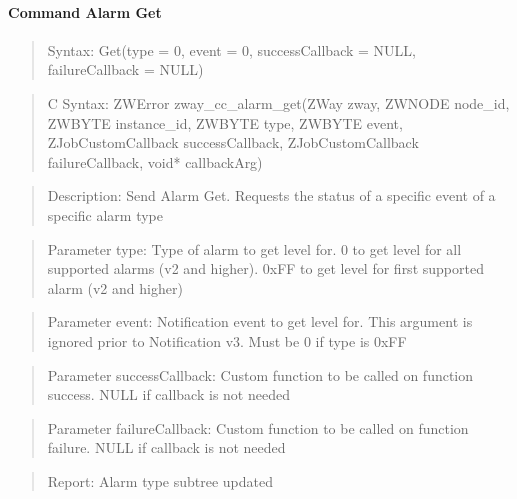 \paragraph{Command Alarm Get}
\begin{quote}Syntax: Get(type = 0, event = 0, successCallback = NULL, failureCallback = NULL)\end{quote}
\begin{quote}C Syntax: ZWError zway\_cc\_alarm\_get(ZWay zway, ZWNODE node\_id, ZWBYTE instance\_id, ZWBYTE type, ZWBYTE event, ZJobCustomCallback successCallback, ZJobCustomCallback failureCallback, void* callbackArg)\end{quote}
\begin{quote}Description: Send Alarm Get. Requests the status of a specific event of a specific alarm type\end{quote}
\begin{quote}Parameter type: Type of alarm to get level for. 0 to get level for all supported alarms (v2 and higher). 0xFF to get level for first supported alarm (v2 and higher)\end{quote}
\begin{quote}Parameter event: Notification event to get level for. This argument is ignored prior to Notification v3. Must be 0 if type is 0xFF\end{quote}
\begin{quote}Parameter successCallback: Custom function to be called on function success. NULL if callback is not needed\end{quote}
\begin{quote}Parameter failureCallback: Custom function to be called on function failure. NULL if callback is not needed\end{quote}
\begin{quote}Report: Alarm type subtree updated\end{quote}

